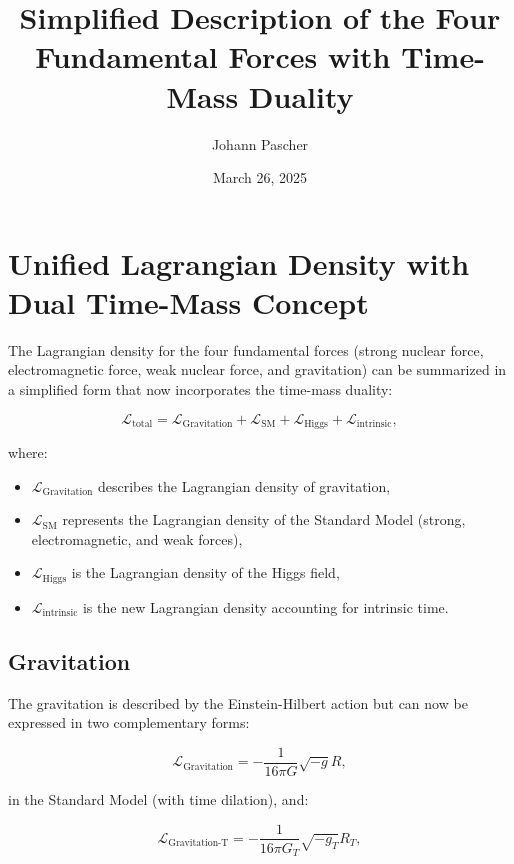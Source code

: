 \documentclass{article}
\title{Simplified Description of the Four Fundamental Forces with Time-Mass Duality}
\author{Johann Pascher}
\date{March 26, 2025}
\begin{document}
	\maketitle
	
	\tableofcontents
	\newpage
	
	\section{Unified Lagrangian Density with Dual Time-Mass Concept}
	
	The Lagrangian density for the four fundamental forces (strong nuclear force, electromagnetic force, weak nuclear force, and gravitation) can be summarized in a simplified form that now incorporates the time-mass duality:
	
	\begin{equation}
		\mathcal{L}_\text{total} = \mathcal{L}_\text{Gravitation} + \mathcal{L}_\text{SM} + \mathcal{L}_\text{Higgs} + \mathcal{L}_\text{intrinsic},
	\end{equation}
	
	where:
	\begin{itemize}
		\item \(\mathcal{L}_\text{Gravitation}\) describes the Lagrangian density of gravitation,
		\item \(\mathcal{L}_\text{SM}\) represents the Lagrangian density of the Standard Model (strong, electromagnetic, and weak forces),
		\item \(\mathcal{L}_\text{Higgs}\) is the Lagrangian density of the Higgs field,
		\item \(\mathcal{L}_\text{intrinsic}\) is the new Lagrangian density accounting for intrinsic time.
	\end{itemize}
	
	\subsection{Gravitation}
	The gravitation is described by the Einstein-Hilbert action but can now be expressed in two complementary forms:
	
	\begin{equation}
		\mathcal{L}_\text{Gravitation} = -\frac{1}{16\pi G} \sqrt{-g} R,
	\end{equation}
	
	in the Standard Model (with time dilation), and:
	
	\begin{equation}
		\mathcal{L}_\text{Gravitation-T} = -\frac{1}{16\pi G_T} \sqrt{-g_T} R_T,
	\end{equation}
	
\end{document}
